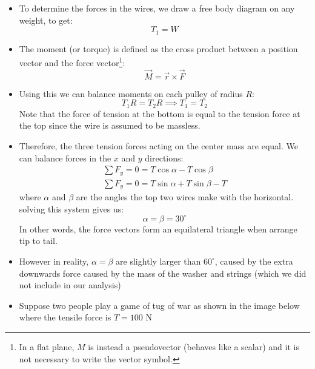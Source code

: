 \begin{itemize}
\begin{center}
    \end{center}
    \item To determine the forces in the wires, we draw a free body diagram on any weight, to get:
    \begin{equation}
        T_1 = W
        \label{eq:}
    \end{equation}
    \item The moment (or torque) is defined as the cross product between a position vector and the force vector\footnote{In a flat plane, $M$ is instead a pseudovector (behaves like a scalar) and it is not necessary to write the vector symbol.}:
    $$\vec{M}=\vec{r}\times \vec{F}$$
    \item Using this we can balance moments on each pulley of radius $R$:
    \begin{equation}
        T_1R=T_2R \implies T_1=T_2
        \label{eq:}
    \end{equation}
    Note that the force of tension at the bottom is equal to the tension force at the top since the wire is assumed to be massless.
    \item Therefore, the three tension forces acting on the center mass are equal. We can balance forces in the $x$ and $y$ directions:
    \begin{align}
        \sum F_y = 0 = T\cos\alpha-T\cos\beta \\ 
        \sum F_y = 0 = T\sin\alpha+T\sin\beta-T 
    \end{align}
    where $\alpha$ and $\beta$ are the angles the top two wires make with the horizontal. solving this system gives us:
    \begin{equation}
        \alpha=\beta=30^\circ
        \label{eq:}
    \end{equation}
    In other words, the force vectors form an equilateral triangle when arrange tip to tail.
    \item However in reality, $\alpha=\beta$ are slightly larger than $60^\circ$, caused by the extra downwards force caused by the mass of the washer and strings (which we did not include in our analysis)
    \item Suppose two people play a game of tug of war as shown in the image below where the tensile force is $T=100 \text{ N}$
\begin{center}

\end{center}
\end{itemize}

